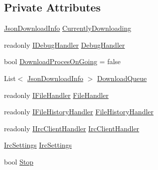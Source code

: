 \subsection*{Private Attributes}
\begin{DoxyCompactItemize}
\item 
\mbox{\hyperlink{class_little_weeb_library_1_1_models_1_1_json_download_info}{Json\+Download\+Info}} \mbox{\hyperlink{class_little_weeb_library_1_1_handlers_1_1_download_handler_a45f8f3fe581060feacfedcaee99d9363}{Currently\+Downloading}}
\item 
readonly \mbox{\hyperlink{interface_little_weeb_library_1_1_handlers_1_1_i_debug_handler}{I\+Debug\+Handler}} \mbox{\hyperlink{class_little_weeb_library_1_1_handlers_1_1_download_handler_a9f1aedadbd6f343d8de1c54724eca11e}{Debug\+Handler}}
\item 
bool \mbox{\hyperlink{class_little_weeb_library_1_1_handlers_1_1_download_handler_a2819c4cad3fca5a4b6ebc9894e3788fc}{Download\+Proces\+On\+Going}} = false
\item 
List$<$ \mbox{\hyperlink{class_little_weeb_library_1_1_models_1_1_json_download_info}{Json\+Download\+Info}} $>$ \mbox{\hyperlink{class_little_weeb_library_1_1_handlers_1_1_download_handler_a11dcd1dea101dd36f9cac44c5d47ad29}{Download\+Queue}}
\item 
readonly \mbox{\hyperlink{interface_little_weeb_library_1_1_handlers_1_1_i_file_handler}{I\+File\+Handler}} \mbox{\hyperlink{class_little_weeb_library_1_1_handlers_1_1_download_handler_abf1cefedf4cb1dd53e3b97823e50ec5f}{File\+Handler}}
\item 
readonly \mbox{\hyperlink{interface_little_weeb_library_1_1_handlers_1_1_i_file_history_handler}{I\+File\+History\+Handler}} \mbox{\hyperlink{class_little_weeb_library_1_1_handlers_1_1_download_handler_a40cbbbcd11e091becd46de0254081661}{File\+History\+Handler}}
\item 
readonly \mbox{\hyperlink{interface_little_weeb_library_1_1_handlers_1_1_i_irc_client_handler}{I\+Irc\+Client\+Handler}} \mbox{\hyperlink{class_little_weeb_library_1_1_handlers_1_1_download_handler_a0ffa906f8e42099ea4a822a33ae707cd}{Irc\+Client\+Handler}}
\item 
\mbox{\hyperlink{class_little_weeb_library_1_1_settings_1_1_irc_settings}{Irc\+Settings}} \mbox{\hyperlink{class_little_weeb_library_1_1_handlers_1_1_download_handler_abd6998e0c48b061f7ec3f53e495054ea}{Irc\+Settings}}
\item 
bool \mbox{\hyperlink{class_little_weeb_library_1_1_handlers_1_1_download_handler_af5e3cf628dab0016b460a3be80798609}{Stop}}
\end{DoxyCompactItemize}


